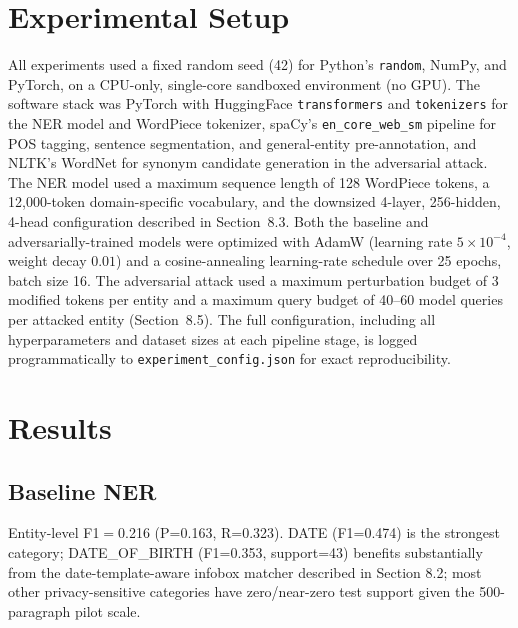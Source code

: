 \documentclass[conference]{IEEEtran}
\begin{document}
\section{Experimental Setup}
All experiments used a fixed random seed (42) for Python's \texttt{random}, NumPy, and PyTorch, on a CPU-only, single-core sandboxed environment (no GPU). The software stack was PyTorch with HuggingFace \texttt{transformers} and \texttt{tokenizers} for the NER model and WordPiece tokenizer, spaCy's \texttt{en\_core\_web\_sm} pipeline for POS tagging, sentence segmentation, and general-entity pre-annotation, and NLTK's WordNet for synonym candidate generation in the adversarial attack. The NER model used a maximum sequence length of 128 WordPiece tokens, a 12{,}000-token domain-specific vocabulary, and the downsized 4-layer, 256-hidden, 4-head configuration described in Section~8.3. Both the baseline and adversarially-trained models were optimized with AdamW (learning rate $5\times10^{-4}$, weight decay $0.01$) and a cosine-annealing learning-rate schedule over 25 epochs, batch size 16. The adversarial attack used a maximum perturbation budget of 3 modified tokens per entity and a maximum query budget of 40--60 model queries per attacked entity (Section~8.5). The full configuration, including all hyperparameters and dataset sizes at each pipeline stage, is logged programmatically to \texttt{experiment\_config.json} for exact reproducibility.

\section{Results}

\subsection{Baseline NER}
Entity-level F1$=$0.216 (P=0.163, R=0.323). DATE (F1=0.474) is the strongest category; DATE\_OF\_BIRTH (F1=0.353, support=43) benefits substantially from the date-template-aware infobox matcher described in Section 8.2; most other privacy-sensitive categories have zero/near-zero test support given the 500-paragraph pilot scale.
\end{document}
